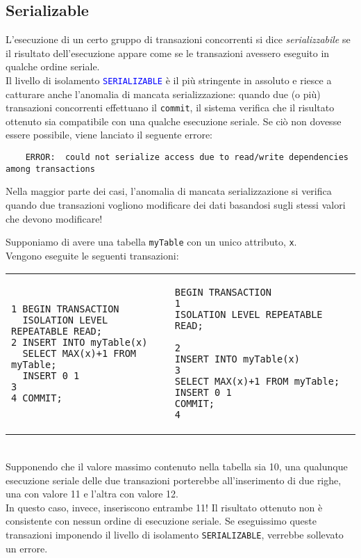 \documentclass[12pt,a4paper]{book}
\begin{document}
	\subsection{Serializable}
	L'esecuzione di un certo gruppo di transazioni concorrenti si dice \textit{serializzabile} se il risultato dell'esecuzione appare come se le transazioni avessero eseguito in qualche ordine seriale.\\
	Il livello di isolamento \textcolor{blue}{\texttt{SERIALIZABLE}} è il più stringente in assoluto e riesce a catturare anche l'anomalia di mancata serializzazione: quando due (o più) transazioni concorrenti effettuano il \texttt{commit}, il sistema verifica che il risultato ottenuto sia compatibile con una qualche esecuzione seriale. Se ciò non dovesse essere possibile, viene lanciato il seguente errore:
	\begin{lstlisting}
	ERROR:  could not serialize access due to read/write dependencies among transactions
	\end{lstlisting}
	Nella maggior parte dei casi, l'anomalia di mancata serializzazione si verifica quando due transazioni vogliono modificare dei dati basandosi sugli stessi valori che devono modificare!\vspace{10px}
	\begin{tcolorbox}[enhanced jigsaw, breakable, title filled, title=Esempio: anomalia di mancata serializzazione]
	Supponiamo di avere una tabella \texttt{myTable} con un unico attributo, \texttt{x}.\\Vengono eseguite le seguenti transazioni:\vspace{10px}\\
	\begin{tabular}{l l}
	\begin{lstlisting}
1 BEGIN TRANSACTION 
  ISOLATION LEVEL REPEATABLE READ; 
2 INSERT INTO myTable(x) 
  SELECT MAX(x)+1 FROM myTable; 
  INSERT 0 1
3
4 COMMIT;
	\end{lstlisting}
	&
	\begin{lstlisting}
BEGIN TRANSACTION 						1
ISOLATION LEVEL REPEATABLE READ;
									 	2
INSERT INTO myTable(x) 					3
SELECT MAX(x)+1 FROM myTable; 		 
INSERT 0 1
COMMIT;								 	4
	\end{lstlisting}
	\end{tabular}\vspace{10px}\\
	Supponendo che il valore massimo contenuto nella tabella sia 10, una qualunque esecuzione seriale delle due transazioni porterebbe all'inserimento di due righe, una con valore 11 e l'altra con valore 12.\\
	In questo caso, invece, inseriscono entrambe 11! Il risultato ottenuto non è consistente con nessun ordine di esecuzione seriale. Se eseguissimo queste transazioni imponendo il livello di isolamento \texttt{SERIALIZABLE}, verrebbe sollevato un errore.
	\end{tcolorbox}
\end{document}
